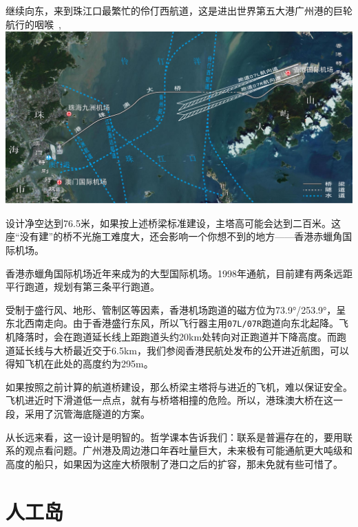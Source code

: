\begin{multicols}{3}
继续向东，来到珠江口最繁忙的伶仃西航道，这是进出世界第五大港广州港的巨轮航行的咽喉\ ,\\\includegraphics[width=2.13\linewidth]{IMG/201912/Map.pdf}%

\noindent 设计净空达到76.5米，如果按上述桥梁标准建设，主塔高可能会达到二百米。这座“没有建”的桥不光施工难度大，还会影响一个你想不到的地方——香港赤蠟角国际机场。

香港赤蠟角国际机场近年来成为的大型国际机场。1998年通航，目前建有两条远距平行跑道，规划有第三条平行跑道。

受制于盛行风、地形、管制区等因素，香港机场跑道的磁方位为73.9°/253.9°，呈东北西南走向。由于香港盛行东风，所以飞行器主用\texttt{07L/07R}跑道向东北起降。飞机降落时，会在跑道延长线上距跑道头约20km处转向对正跑道并下降高度。而跑道延长线与大桥最近交于6.5km，我们参阅香港民航处发布的公开进近航图，可以得知飞机在此处的高度约为295m。

如果按照之前计算的航道桥建设，那么桥梁主塔将与进近的飞机，难以保证安全。飞机进近时下滑道低一点点，就有与桥塔相撞的危险。所以，港珠澳大桥在这一段，采用了沉管海底隧道的方案。

从长远来看，这一设计是明智的。哲学课本告诉我们：联系是普遍存在的，要用联系的观点看问题。广州港及周边港口年吞吐量巨大，未来极有可能通航更大吨级和高度的船只，如果因为这座大桥限制了港口之后的扩容，那未免就有些可惜了。



\rule{0em}{17.23em}

\section*{人工岛}


\end{multicols}
